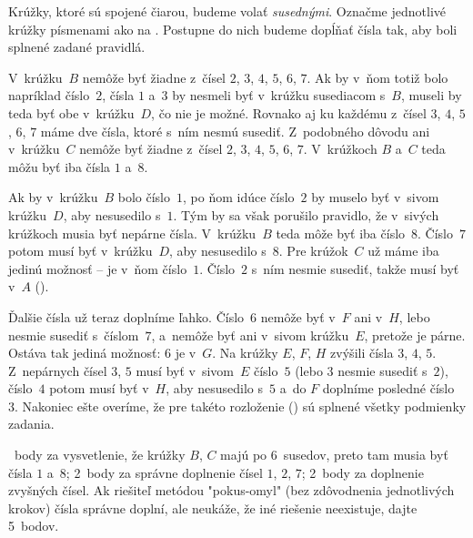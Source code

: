 {%
Krúžky, ktoré sú spojené čiarou, budeme volať {\it susednými}. Označme jednotlivé krúžky písmenami ako na \obr{}. Postupne do nich budeme dopĺňať čísla tak, aby boli splnené zadané pravidlá. 
%

V~krúžku~$B$ nemôže byť žiadne z~čísel $2$, $3$, $4$, $5$, $6$, $7$. Ak by v~ňom totiž bolo napríklad číslo~$2$, čísla $1$ a~$3$ by nesmeli byť v~krúžku susediacom s~$B$, museli by teda byť obe v~krúžku~$D$, čo nie je možné. Rovnako aj ku každému z~čísel $3$, $4$, $5$, $6$, $7$ máme dve čísla, ktoré s~ním nesmú susediť. Z~podobného dôvodu ani v~krúžku~$C$ nemôže byť žiadne z~čísel $2$, $3$, $4$, $5$, $6$, $7$. V~krúžkoch $B$ a~$C$ teda môžu byť iba čísla $1$ a~$8$.

Ak by v~krúžku~$B$ bolo číslo~$1$, po ňom idúce číslo~$2$ by muselo byť v~sivom krúžku~$D$, aby nesusedilo s~$1$. Tým by sa však porušilo pravidlo, že v~sivých krúžkoch musia byť nepárne čísla. V~krúžku~$B$ teda môže byť iba číslo~$8$. Číslo~$7$ potom musí byť v~krúžku~$D$, aby nesusedilo s~$8$. Pre krúžok~$C$ už máme iba jedinú možnosť -- je v~ňom číslo~$1$. Číslo~$2$ s~ním nesmie susediť, takže musí byť v~$A$ (\obr).
% 

Ďalšie čísla už teraz doplníme ľahko. Číslo~$6$ nemôže byť v~$F$ ani v~$H$, lebo nesmie susediť s~číslom~$7$, a~nemôže byť ani v~sivom krúžku~$E$, pretože je párne. Ostáva tak jediná možnosť: $6$ je v~$G$. Na krúžky $E$, $F$, $H$ zvýšili čísla $3$, $4$, $5$. Z~nepárnych čísel $3$, $5$ musí byť v~sivom~$E$ číslo~$5$ (lebo $3$ nesmie susediť s~$2$), číslo~$4$ potom musí byť v~$H$, aby nesusedilo s~$5$ a~do $F$ doplníme posledné číslo~$3$. Nakoniec ešte overíme, že pre takéto rozloženie (\obr) sú splnené všetky podmienky zadania. 
%

~body za vysvetlenie, že krúžky $B$, $C$ majú po 6~susedov, preto tam musia byť čísla $1$ a~$8$; 2~body za správne doplnenie čísel $1$, $2$, $7$; 2~body za doplnenie zvyšných čísel. Ak riešiteľ metódou "pokus-omyl" (bez zdôvodnenia jednotlivých krokov) čísla správne doplní, ale neukáže, že iné riešenie neexistuje, dajte 5~bodov.
 
\endhodnotenie
}

